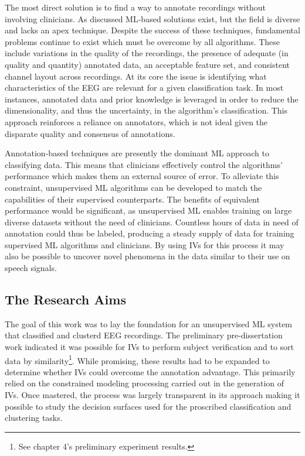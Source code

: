 The most direct solution is to find a way to annotate recordings without involving clinicians. As discussed \ac{ML}-based solutions exist, but the field is diverse and lacks an apex technique. Despite the success of these techniques, fundamental problems continue to exist which must be overcome by all algorithms. These include variations in the quality of the recordings, the presence of adequate (in quality and quantity) annotated data, an acceptable feature set, and consistent channel layout across recordings. At its core the issue is identifying what characteristics of the \ac{EEG} are relevant for a given classification task. In most instances, annotated data and prior knowledge is leveraged in order to reduce the dimensionality, and thus the uncertainty, in the algorithm's classification. This approach reinforces a reliance on annotators, which is not ideal given the disparate quality and consensus of annotations.

Annotation-based techniques are presently the dominant \ac{ML} approach to classifying data. This means that clinicians effectively control the algorithms' performance which makes them an external source of error. To alleviate this constraint, unsupervised \ac{ML} algorithms can be developed to match the capabilities of their supervised counterparts. The benefits of equivalent performance would be significant, as unsupervised \ac{ML} enables training on large diverse datasets without the need of clinicians. Countless hours of data in need of annotation could thus be labeled, producing a steady supply of data for training supervised \ac{ML} algorithms and clinicians. By using \acp{IV} for this process it may also be possible to uncover novel phenomena in the data similar to their use on speech signals.

\subsection{The Research Aims}

The goal of this work was to lay the foundation for an unsupervised \ac{ML} system that classified and clusterd \ac{EEG} recordings. The preliminary pre-dissertation work indicated it was possible for \acp{IV} to perform subject verification and to sort data by similarity\footnote{See chapter 4's preliminary experiment results.}. While promising, these results had to be expanded to determine whether \acp{IV} could overcome the annotation advantage. This primarily relied on the constrained modeling processing carried out in the generation of \acp{IV}. Once mastered, the process was largely transparent in its approach making it possible to study the decision surfaces used for the proscribed classification and clustering tasks.

